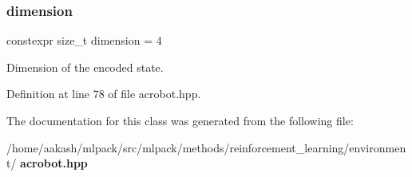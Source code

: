 \subsubsection{dimension}
{\footnotesize\ttfamily constexpr size\+\_\+t dimension = 4\hspace{0.3cm}{\ttfamily [static]}}



Dimension of the encoded state. 



Definition at line 78 of file acrobot.\+hpp.



The documentation for this class was generated from the following file\+:\begin{DoxyCompactItemize}
\item 
/home/aakash/mlpack/src/mlpack/methods/reinforcement\+\_\+learning/environment/\textbf{ acrobot.\+hpp}\end{DoxyCompactItemize}
